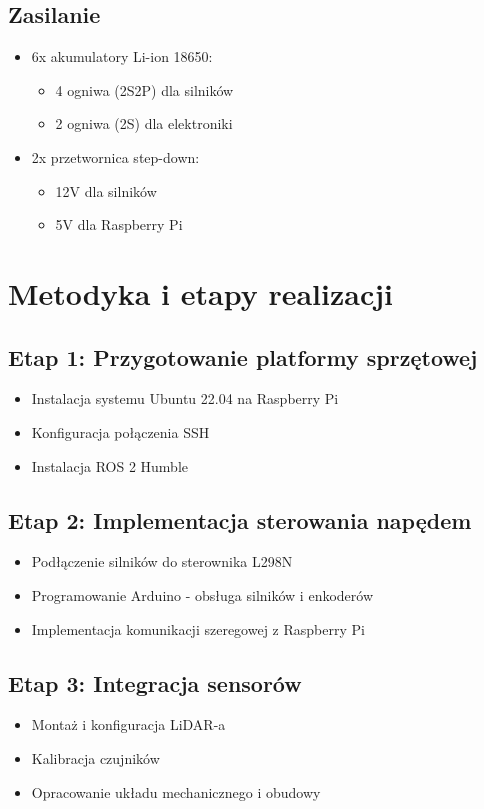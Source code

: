 \documentclass[a4paper,twoside,12pt]{book}
\begin{document}
\subsection{Zasilanie}
\begin{itemize}
\item 6x akumulatory Li-ion 18650:
	\begin{itemize}
	\item 4 ogniwa (2S2P) dla silników
	\item 2 ogniwa (2S) dla elektroniki
	\end{itemize}
\item 2x przetwornica step-down:
	\begin{itemize}
	\item 12V dla silników
	\item 5V dla Raspberry Pi
	\end{itemize}
\end{itemize}

\section{Metodyka i etapy realizacji}
\subsection{Etap 1: Przygotowanie platformy sprzętowej}
\begin{itemize}
\item Instalacja systemu Ubuntu 22.04 na Raspberry Pi
\item Konfiguracja połączenia SSH
\item Instalacja ROS 2 Humble
\end{itemize}

\subsection{Etap 2: Implementacja sterowania napędem}
\begin{itemize}
\item Podłączenie silników do sterownika L298N
\item Programowanie Arduino - obsługa silników i enkoderów
\item Implementacja komunikacji szeregowej z Raspberry Pi
\end{itemize}

\subsection{Etap 3: Integracja sensorów}
\begin{itemize}
\item Montaż i konfiguracja LiDAR-a
\item Kalibracja czujników
\item Opracowanie układu mechanicznego i obudowy
\end{itemize}
\end{document}
